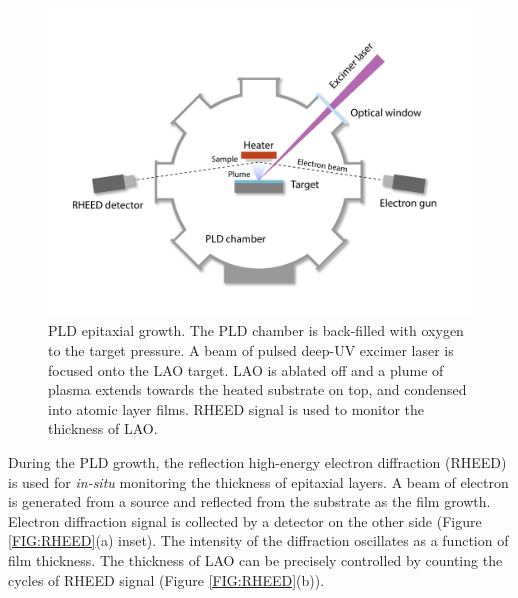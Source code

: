 \documentclass[pdflatex, sectionletters, 12pt]{pittetd}    %
\begin{document}
\begin{figure}[hp!]
	\centering
	\includegraphics[width=1.0\textwidth]{Drawing/PLD.pdf}
	\caption{PLD epitaxial growth. The PLD chamber is back-filled with oxygen to the target pressure. A beam of pulsed deep-UV excimer laser is focused onto the LAO target. LAO is ablated off and a plume of plasma extends towards the heated substrate on top, and condensed into atomic layer films. RHEED signal is used to monitor the thickness of LAO.}
	\label{FIG:PLD}
\end{figure}

During the PLD growth, the reflection high-energy electron diffraction (RHEED) is used for \emph{in-situ} monitoring the thickness of epitaxial layers. A beam of electron is generated from a source and reflected from the substrate as the film growth. Electron diffraction signal is collected by a detector on the other side (Figure \ref{FIG:RHEED}(a) inset). The intensity of the diffraction oscillates as a function of film thickness. The thickness of LAO can be precisely controlled by counting the cycles of RHEED signal (Figure \ref{FIG:RHEED}(b)).
\end{document}
